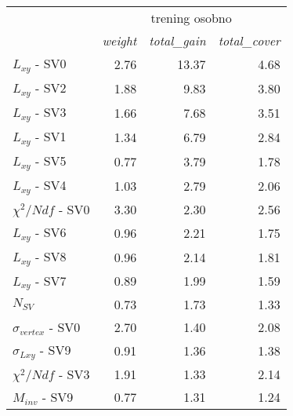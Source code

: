 \begin{table}
\centering
\begin{tabular}{lrrr}
\toprule
{} & \multicolumn{3}{c}{trening osobno} \\
{} & \textit{weight} & \textit{total\_gain} & \textit{total\_cover} \\
\midrule
$L_{xy}$ - SV0          &         2.76 &            13.37 &              4.68 \\
$L_{xy}$ - SV2          &         1.88 &             9.83 &              3.80 \\
$L_{xy}$ - SV3          &         1.66 &             7.68 &              3.51 \\
$L_{xy}$ - SV1          &         1.34 &             6.79 &              2.84 \\
\vspace{\everyNthRowSpace}
$L_{xy}$ - SV5          &         0.77 &             3.79 &              1.78 \\
$L_{xy}$ - SV4          &         1.03 &             2.79 &              2.06 \\
$\chi^2/Ndf$ - SV0      &         3.30 &             2.30 &              2.56 \\
$L_{xy}$ - SV6          &         0.96 &             2.21 &              1.75 \\
$L_{xy}$ - SV8          &         0.96 &             2.14 &              1.81 \\
\vspace{\everyNthRowSpace}
$L_{xy}$ - SV7          &         0.89 &             1.99 &              1.59 \\
$N_{SV}$                &         0.73 &             1.73 &              1.33 \\
$\sigma_{vertex}$ - SV0 &         2.70 &             1.40 &              2.08 \\
$\sigma_{Lxy}$ - SV9    &         0.91 &             1.36 &              1.38 \\
$\chi^2/Ndf$ - SV3      &         1.91 &             1.33 &              2.14 \\
$M_{inv}$ - SV9         &         0.77 &             1.31 &              1.24 \\


\end{tabular}
\end{table}

